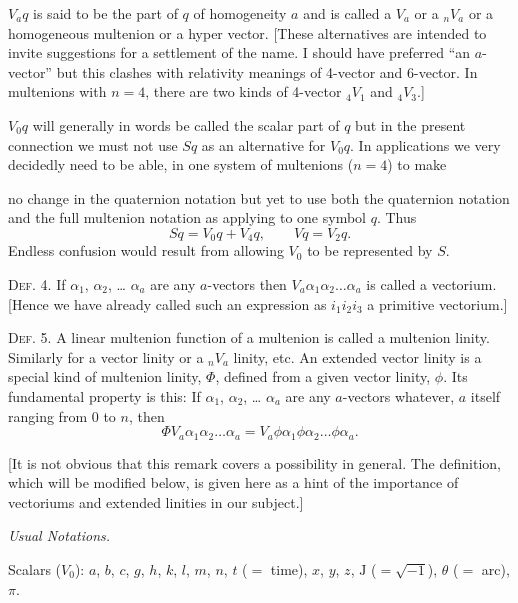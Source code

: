 \documentclass[11pt]{article}
\begin{document}
$V_aq$ is said to be the part of $q$ of homogeneity $a$ and is called a $V_a$
or a ${}_nV_a$ or a homogeneous multenion or a hyper vector. [These alternatives
are intended to invite suggestions for a settlement of the name. I should have
preferred ``an $a$-vector'' but this clashes with relativity meanings of
4-vector and 6-vector. In multenions with $n=4$, there are two kinds of
4-vector ${}_4V_1$ and ${}_4V_3$.]

$V_0q$ will generally in words be called the scalar part of $q$ but in the
present connection we must not use $Sq$ as an alternative for $V_0q$. In
applications we very decidedly need to be able, in one system of multenions
($n=4$) to make

no change in the quaternion notation but yet to use both the quaternion
notation and the full multenion notation as applying to one symbol $q$. Thus
\begin{equation*}
  Sq=V_0q+V_4q, \qquad Vq=V_2q.
\end{equation*}
Endless confusion would result from allowing $V_0$ to be represented by $S$.

\noindent\textsc{Def. 4.} If $\alpha_1$, $\alpha_2$, \ldots{} $\alpha_a$ are
any $a$-vectors then $V_a\alpha_1\alpha_2\ldots\alpha_a$ is called a
vectorium. [Hence we have already called such an expression as $i_1i_2i_3$ a
primitive vectorium.]

\noindent\textsc{Def. 5.} A linear multenion function of a multenion is called
a multenion linity. Similarly for a vector linity or a ${}_nV_a$ linity, etc.
An extended vector linity is a special kind of multenion linity, $\Phi$, defined
from a given vector linity, $\phi$. Its fundamental property is this: If
$\alpha_1$, $\alpha_2$, \ldots{} $\alpha_a$ are any $a$-vectors whatever, $a$
itself ranging from $0$ to $n$, then
\begin{equation}
  \Phi V_a\alpha_1\alpha_2\ldots\alpha_a
    = V_a\phi\alpha_1\phi\alpha_2\ldots\phi\alpha_a.
\tag{2}
\end{equation}

[It is not obvious that this remark covers a possibility in general. The
definition, which will be modified below, is given here as a hint of the
importance of vectoriums and extended linities in our subject.]


\begin{center}
  \textit{Usual Notations.}
\end{center}

\noindent Scalars ($V_0$): $a$, $b$, $c$, $g$, $h$, $k$, $l$, $m$, $n$,
$t$ ($=$ time), $x$, $y$, $z$, $\mathrm{J}$ ($=\sqrt{-1}$), $\theta$
($=$ arc), $\pi$.
\end{document}
